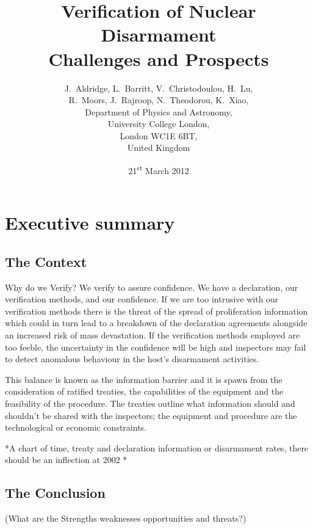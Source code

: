 \documentclass[twoside,titlepage,11pt,twocolumn,a4paper]{article}
\begin{document}
\title{Verification of Nuclear Disarmament \\
Challenges and Prospects}
\author{J.~Aldridge, L.~Barritt, V.~Christodoulou, H.~Lu, \\
	R.~Moors, J.~Rajroop, N.~Theodorou, K.~Xiao, \\
\small	Department of Physics and Astronomy, \\
\small	University College London, \\
\small	London WC1E 6BT, \\
\small	United Kingdom}
\date{21\textsuperscript{st} March 2012}
\maketitle

\onecolumn
\cleardoublepage

\section*{Executive summary}
\subsection*{The Context}
Why do we Verify?  We verify to assure confidence. We have a
declaration, our verification methods, and our confidence. If we are
too intrusive with our verification methods there is the threat of the
spread of proliferation information which could in turn lead to a
breakdown of the declaration agreements alongside an increased risk of
mass devastation. If the verification methods employed are too feeble,
the uncertainty in the confidence will be high and inspectors may fail
to detect anomalous behaviour in the host's disarmament activities.

This balance is known as the information barrier and it is spawn from
the consideration of ratified treaties, the capabilities of the
equipment and the feasibility of the procedure. The treaties outline
what information should and shouldn't be shared with the inspectors;
the equipment and procedure are the technological or economic
constraints.

*A chart of time, treaty and declaration information or disarmament
rates, there should be an inflection at 2002 *

\subsection*{The Conclusion}
(What are the Strengths weaknesses opportunities and threats?)
\end{document}
